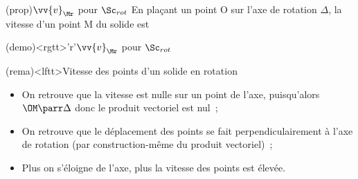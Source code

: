 \documentclass[../../main/main.tex]{subfiles}
\begin{document}
\begin{tcbraster}[raster equal height=rows, raster columns=2]
	\begin{tcb*}(prop){$\protect\vv{v}_{\Mr}$ pour $\Sc_{rot}$}
		En plaçant un point O sur l'axe de rotation $\Delta$, la vitesse d'un point
		M du solide est
		\psw{
			\[
				\boxed{\vf_{\Mr/\Rc}(t) = \vv{\W}_{\Sc/\Rc} \wedge \OM}
			\]
		}
		\vspace{-15pt}
	\end{tcb*}
	\begin{tcb*}(demo)<rgtt>'r'{$\protect\vv{v}_{\Mr}$ pour $\Sc_{rot}$}
		\vspace{-15pt}
		\vspace{-15pt}
	\end{tcb*}
\end{tcbraster}

\begin{tcb*}(rema)<lftt>{Vitesse des points d'un solide en rotation}
	\begin{itemize}
		\item On retrouve que la vitesse est nulle sur un point de l'axe,
		      puisqu'alors $\OM \parr \Delta$ donc le produit vectoriel est nul~;
		\item On retrouve que le déplacement des points se fait perpendiculairement
		      à l'axe de rotation (par construction-même du produit vectoriel)~;
		\item Plus on s'éloigne de l'axe, plus la vitesse des points est élevée.
	\end{itemize}
\end{tcb*}
\end{document}
